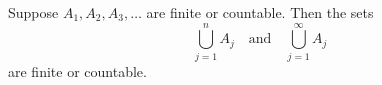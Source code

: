 Suppose $A_1, A_2, A_3, \ldots$ are finite or countable. Then the sets
$$\bigcup_{j=1}^{n} A_j \quad \text{and} \quad \bigcup_{j=1}^{\infty} A_j$$
are finite or countable.
